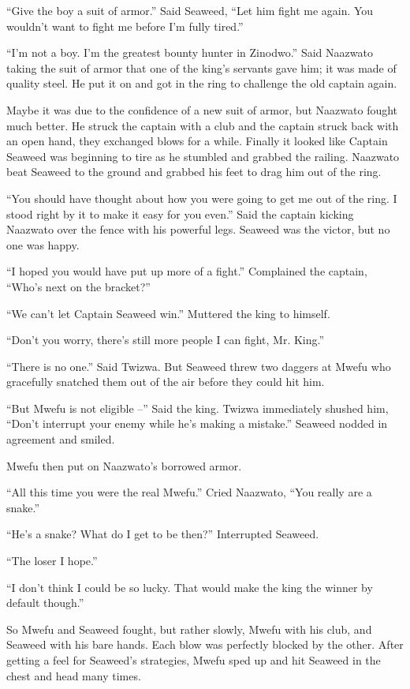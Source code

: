 ``Give the boy a suit of armor.'' Said Seaweed, ``Let him fight me again. You wouldn't want to fight me before I'm fully tired.''

``I'm not a boy. I'm the greatest bounty hunter in Zinodwo.'' Said Naazwato taking the suit of armor that one of the king's servants gave him; it was made of quality steel. He put it on and got in the ring to challenge the old captain again.

Maybe it was due to the confidence of a new suit of armor, but Naazwato fought much better. He struck the captain with a club and the captain struck back with an open hand, they exchanged blows for a while. Finally it looked like Captain Seaweed was beginning to tire as he stumbled and grabbed the railing. Naazwato beat Seaweed to the ground and grabbed his feet to drag him out of the ring.

``You should have thought about how you were going to get me out of the ring. I stood right by it to make it easy for you even.'' Said the captain kicking Naazwato over the fence with his powerful legs.
Seaweed was the victor, but no one was happy.

``I hoped you would have put up more of a fight.'' Complained the captain, ``Who's next on the bracket?''

``We can't let Captain Seaweed win.'' Muttered the king to himself.

``Don't you worry, there's still more people I can fight, Mr. King.''

``There is no one.'' Said Twizwa. But Seaweed threw two daggers at Mwefu who gracefully snatched them out of the air before they could hit him. 

``But Mwefu is not eligible --'' Said the king. Twizwa immediately shushed him, ``Don't interrupt your enemy while he's making a mistake.'' Seaweed nodded in agreement and smiled.

Mwefu then put on Naazwato's borrowed armor.

``All this time you were the real Mwefu.'' Cried Naazwato, ``You really are a snake.''

``He's a snake? What do I get to be then?'' Interrupted Seaweed.

``The loser I hope.''

``I don't think I could be so lucky. That would make the king the winner by default though.''

So Mwefu and Seaweed fought, but rather slowly, Mwefu with his club, and Seaweed with his bare hands.
Each blow was perfectly blocked by the other. After getting a feel for Seaweed's strategies, Mwefu sped up and hit Seaweed in the chest and head many times.

